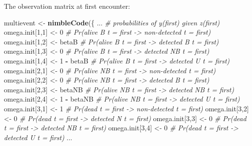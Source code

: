 \documentclass[
  12pt,
]{krantz}
\newenvironment{Shaded}{\begin{snugshade}}{\end{snugshade}}
\newcommand{\CommentTok}[1]{\textcolor[rgb]{0.56,0.35,0.01}{\textit{#1}}}
\newcommand{\DecValTok}[1]{\textcolor[rgb]{0.00,0.00,0.81}{#1}}
\newcommand{\FunctionTok}[1]{\textcolor[rgb]{0.13,0.29,0.53}{\textbf{#1}}}
\newcommand{\NormalTok}[1]{#1}
\newcommand{\OtherTok}[1]{\textcolor[rgb]{0.56,0.35,0.01}{#1}}
\newcommand{\SpecialCharTok}[1]{\textcolor[rgb]{0.81,0.36,0.00}{\textbf{#1}}}
\begin{document}
The observation matrix at first encounter:

\begin{Shaded}
\begin{Highlighting}[]
\NormalTok{multievent }\OtherTok{\textless{}{-}} \FunctionTok{nimbleCode}\NormalTok{(\{}
\NormalTok{...}
  \CommentTok{\# probabilities of y(first) given z(first)}
\NormalTok{  omega.init[}\DecValTok{1}\NormalTok{,}\DecValTok{1}\NormalTok{] }\OtherTok{\textless{}{-}} \DecValTok{0}          \CommentTok{\# Pr(alive B t = first {-}\textgreater{} non{-}detected t = first)}
\NormalTok{  omega.init[}\DecValTok{1}\NormalTok{,}\DecValTok{2}\NormalTok{] }\OtherTok{\textless{}{-}}\NormalTok{ betaB      }\CommentTok{\# Pr(alive B t = first {-}\textgreater{} detected B t = first)}
\NormalTok{  omega.init[}\DecValTok{1}\NormalTok{,}\DecValTok{3}\NormalTok{] }\OtherTok{\textless{}{-}} \DecValTok{0}          \CommentTok{\# Pr(alive B t = first {-}\textgreater{} detected NB t = first)}
\NormalTok{  omega.init[}\DecValTok{1}\NormalTok{,}\DecValTok{4}\NormalTok{] }\OtherTok{\textless{}{-}} \DecValTok{1} \SpecialCharTok{{-}}\NormalTok{ betaB  }\CommentTok{\# Pr(alive B t = first {-}\textgreater{} detected U t = first)}
\NormalTok{  omega.init[}\DecValTok{2}\NormalTok{,}\DecValTok{1}\NormalTok{] }\OtherTok{\textless{}{-}} \DecValTok{0}          \CommentTok{\# Pr(alive NB t = first {-}\textgreater{} non{-}detected t = first)}
\NormalTok{  omega.init[}\DecValTok{2}\NormalTok{,}\DecValTok{2}\NormalTok{] }\OtherTok{\textless{}{-}} \DecValTok{0}          \CommentTok{\# Pr(alive NB t = first {-}\textgreater{} detected B t = first)}
\NormalTok{  omega.init[}\DecValTok{2}\NormalTok{,}\DecValTok{3}\NormalTok{] }\OtherTok{\textless{}{-}}\NormalTok{ betaNB     }\CommentTok{\# Pr(alive NB t = first {-}\textgreater{} detected NB t = first)}
\NormalTok{  omega.init[}\DecValTok{2}\NormalTok{,}\DecValTok{4}\NormalTok{] }\OtherTok{\textless{}{-}} \DecValTok{1} \SpecialCharTok{{-}}\NormalTok{ betaNB }\CommentTok{\# Pr(alive NB t = first {-}\textgreater{} detected U t = first)}
\NormalTok{  omega.init[}\DecValTok{3}\NormalTok{,}\DecValTok{1}\NormalTok{] }\OtherTok{\textless{}{-}} \DecValTok{1}          \CommentTok{\# Pr(dead t = first {-}\textgreater{} non{-}detected t = first)}
\NormalTok{  omega.init[}\DecValTok{3}\NormalTok{,}\DecValTok{2}\NormalTok{] }\OtherTok{\textless{}{-}} \DecValTok{0}          \CommentTok{\# Pr(dead t = first {-}\textgreater{} detected N t = first)}
\NormalTok{  omega.init[}\DecValTok{3}\NormalTok{,}\DecValTok{3}\NormalTok{] }\OtherTok{\textless{}{-}} \DecValTok{0}          \CommentTok{\# Pr(dead t = first {-}\textgreater{} detected NB t = first)}
\NormalTok{  omega.init[}\DecValTok{3}\NormalTok{,}\DecValTok{4}\NormalTok{] }\OtherTok{\textless{}{-}} \DecValTok{0}          \CommentTok{\# Pr(dead t = first {-}\textgreater{} detected U t = first)}
\NormalTok{...}
\end{Highlighting}
\end{Shaded}
\end{document}
